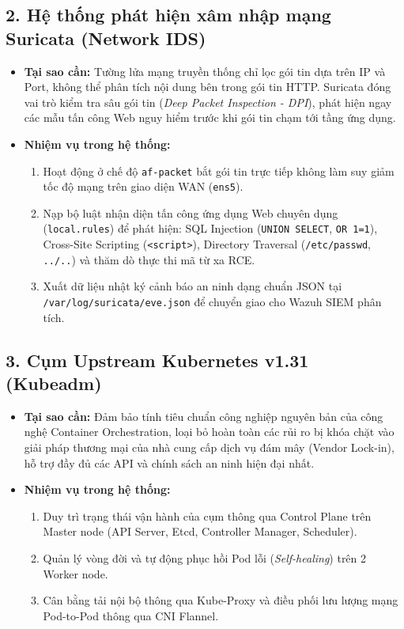 \subsection{2. Hệ thống phát hiện xâm nhập mạng Suricata (Network IDS)}
\begin{itemize}
    \item \textbf{Tại sao cần:} Tường lửa mạng truyền thống chỉ lọc gói tin dựa trên IP và Port, không thể phân tích nội dung bên trong gói tin HTTP. Suricata đóng vai trò kiểm tra sâu gói tin (\textit{Deep Packet Inspection - DPI}), phát hiện ngay các mẫu tấn công Web nguy hiểm trước khi gói tin chạm tới tầng ứng dụng.
    \item \textbf{Nhiệm vụ trong hệ thống:}
    \begin{enumerate}
        \item Hoạt động ở chế độ \texttt{af-packet} bắt gói tin trực tiếp không làm suy giảm tốc độ mạng trên giao diện WAN (\texttt{ens5}).
        \item Nạp bộ luật nhận diện tấn công ứng dụng Web chuyên dụng (\texttt{local.rules}) để phát hiện: SQL Injection (\texttt{UNION SELECT}, \texttt{OR 1=1}), Cross-Site Scripting (\texttt{<script>}), Directory Traversal (\texttt{/etc/passwd}, \texttt{../..}) và thăm dò thực thi mã từ xa RCE.
        \item Xuất dữ liệu nhật ký cảnh báo an ninh dạng chuẩn JSON tại \texttt{/var/log/suricata/eve.json} để chuyển giao cho Wazuh SIEM phân tích.
    \end{enumerate}
\end{itemize}

\subsection{3. Cụm Upstream Kubernetes v1.31 (Kubeadm)}
\begin{itemize}
    \item \textbf{Tại sao cần:} Đảm bảo tính tiêu chuẩn công nghiệp nguyên bản của công nghệ Container Orchestration, loại bỏ hoàn toàn các rủi ro bị khóa chặt vào giải pháp thương mại của nhà cung cấp dịch vụ đám mây (Vendor Lock-in), hỗ trợ đầy đủ các API và chính sách an ninh hiện đại nhất.
    \item \textbf{Nhiệm vụ trong hệ thống:}
    \begin{enumerate}
        \item Duy trì trạng thái vận hành của cụm thông qua Control Plane trên Master node (API Server, Etcd, Controller Manager, Scheduler).
        \item Quản lý vòng đời và tự động phục hồi Pod lỗi (\textit{Self-healing}) trên 2 Worker node.
        \item Cân bằng tải nội bộ thông qua Kube-Proxy và điều phối lưu lượng mạng Pod-to-Pod thông qua CNI Flannel.
    \end{enumerate}
\end{itemize}

